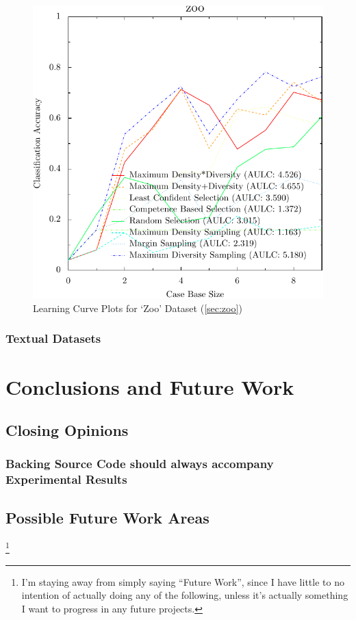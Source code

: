 \documentclass[a4paper,11pt]{report}
\begin{document}
\begin{figure}[h!]
\includegraphics{./Plots/zoo}
\caption{Learning Curve Plots for `Zoo' Dataset (\ref{sec:zoo})}
\end{figure}

\subsection{Textual Datasets}

\chapter{Conclusions and Future Work\label{cha:conclusions}}

\section{Closing Opinions}
\subsection{Backing Source Code should always accompany Experimental Results}

\section{Possible Future Work Areas} \footnote{I'm staying away from simply saying ``Future Work'', since I have little to no intention of actually doing any of the following, unless it's actually something I want to progress in any future projects.}
\end{document}
